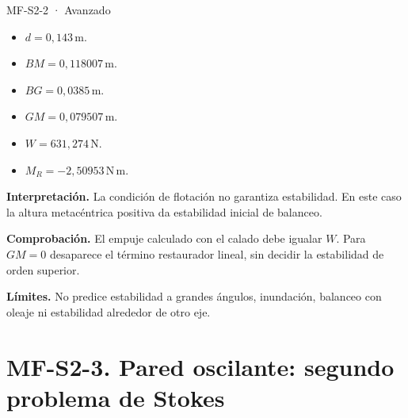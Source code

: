 \begin{studiumworked}{MF-S2-2 · Avanzado}
\begin{itemize}
\item $d=0{,}143\,\mathrm{m}$.

\item $BM=0{,}118007\,\mathrm{m}$.

\item $BG=0{,}0385\,\mathrm{m}$.

\item $GM=0{,}079507\,\mathrm{m}$.

\item $W=631{,}274\,\mathrm{N}$.

\item $M_R=-2{,}50953\,\mathrm{N\,m}$.

\end{itemize}

\textbf{Interpretación.} La condición de flotación no garantiza estabilidad. En este caso la altura metacéntrica positiva da estabilidad inicial de balanceo.

\textbf{Comprobación.} El empuje calculado con el calado debe igualar $W$. Para $GM=0$ desaparece el término restaurador lineal, sin decidir la estabilidad de orden superior.

\textbf{Límites.} No predice estabilidad a grandes ángulos, inundación, balanceo con oleaje ni estabilidad alrededor de otro eje.

\end{studiumworked}

\Needspace{.30\textheight}\section{MF-S2-3. Pared oscilante: segundo problema de Stokes}

